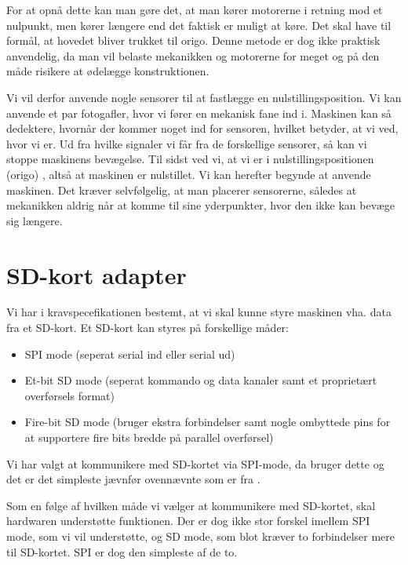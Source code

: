 For at opnå dette kan man gøre det, at man kører motorerne i retning
mod et nulpunkt, men kører længere end det faktisk er muligt at
køre. Det skal have til formål, at hovedet bliver trukket til
origo. Denne metode er dog ikke praktisk anvendelig, da man vil belaste
mekanikken og motorerne for meget og på den måde risikere at ødelægge
konstruktionen.

Vi vil derfor anvende nogle sensorer til at fastlægge en nulstillingsposition.
Vi kan anvende et par fotogafler, hvor vi fører
en mekanisk fane ind i. Maskinen kan så dedektere, hvornår der kommer
noget ind for sensoren, hvilket betyder, at vi ved, hvor vi er. Ud fra
hvilke signaler vi får fra de forskellige sensorer, så kan vi stoppe
maskinens bevægelse. Til sidst ved vi, at vi er i nulstillingspositionen (origo)
, altså at maskinen er nulstillet. Vi kan herefter begynde at anvende
maskinen. Det kræver selvfølgelig, at man placerer sensorerne, således
at mekanikken aldrig når at komme til sine yderpunkter, hvor den ikke
kan bevæge sig længere.


\section{SD-kort adapter}

Vi har i kravspecefikationen bestemt, at vi skal kunne styre maskinen
vha. data fra et SD-kort. Et SD-kort kan styres på forskellige måder:

\begin{itemize} \firmlist
\item{SPI mode (seperat serial ind eller serial ud)}
\item{Et-bit SD mode (seperat kommando og data kanaler samt et
    proprietært overførsels format)}
\item{Fire-bit SD mode (bruger ekstra forbindelser samt nogle
    ombyttede pins for at supportere fire bits bredde på parallel
    overførsel)}
\end{itemize}

Vi har valgt at kommunikere med SD-kortet via SPI-mode, da
\cite{web:captain-mmc} bruger dette og det er det simpleste jævnfør
ovennævnte som er fra \cite{web:sd-pinout}.

Som en følge af hvilken måde vi vælger at kommunikere med SD-kortet,
skal hardwaren understøtte funktionen. Der er dog ikke stor forskel imellem
SPI mode, som vi vil understøtte, og SD mode, som blot kræver to
forbindelser mere til SD-kortet. SPI er dog den simpleste
af de to.

